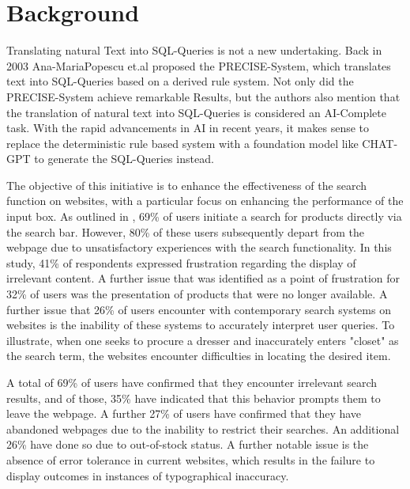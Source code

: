 \documentclass[../../submission.tex]{subfiles}
\begin{document}
\section{Background}
Translating natural Text into SQL-Queries is not a new undertaking. 
Back in 2003 Ana-MariaPopescu et.al proposed the PRECISE-System, which translates text into SQL-Queries
based on a derived rule system. Not only did the PRECISE-System achieve remarkable Results, but the authors
also mention that the translation of natural text into SQL-Queries is considered an AI-Complete task. With 
the rapid advancements in AI in recent years, it makes sense to replace the deterministic rule based system 
with a foundation model like CHAT-GPT to generate the SQL-Queries instead. 

The objective of this initiative is to enhance the effectiveness of the search function on websites, with a particular focus on enhancing the performance of the input box. 
As outlined in  \cite{customerLeavingSites} , 69\% of users initiate a search for products directly via the search bar. 
However, 80\% of these users subsequently depart from the webpage due to unsatisfactory experiences with the search functionality. 
In this study, 41\% of respondents expressed frustration regarding the display of irrelevant content. 
A further issue that was identified as a point of frustration for 32\% of users was the presentation of products that were no longer available. 
A further issue that 26\% of users encounter with contemporary search systems on websites is the inability of these systems to accurately interpret user queries. 
To illustrate, when one seeks to procure a dresser and inaccurately enters "closet" as the search term, the websites encounter difficulties in locating the desired item.

A total of 69\% of users have confirmed that they encounter irrelevant search results, and of those, 35\% have indicated that this behavior prompts them to leave the webpage. 
A further 27\% of users have confirmed that they have abandoned webpages due to the inability to restrict their searches. An additional 26\% have done so due to out-of-stock status. 
A further notable issue is the absence of error tolerance in current websites, which results in the failure to display outcomes in instances of typographical inaccuracy.
\end{document}
